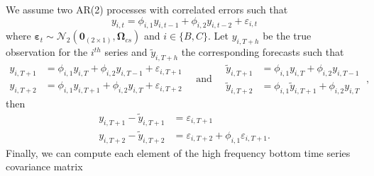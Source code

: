 \documentclass[a4paper,11pt]{article}
\newcommand{\epsvet}{\bm{\varepsilon}}
\newcommand{\Zerovet}{\bm{0}}
\newcommand{\Omegavet}{\bm{\Omega}}
\theoremstyle{definition}
\begin{document}
We assume two AR(2) processes with correlated errors such that
$$
	y_{i,t} = \phi_{i,1}y_{i,t-1} + \phi_{i,2}y_{i,t-2} + \varepsilon_{i,t}
$$
where $\epsvet_t \sim \mathcal{N}_{2}\left(\Zerovet_{(2\times 1)}, \Omegavet_{cs}\right)$ and $i \in \{B, C\}$. Let $y_{i,T+h}$ be the true observation for the $i^{th}$ series and $\widetilde{y}_{i,T+h}$ the corresponding forecasts such that
$$
	\begin{array}{rl}
		y_{i,T+1} & = \phi_{i,1}y_{i,T} + \phi_{i,2}y_{i,T-1} + \varepsilon_{i,T+1} \\
		y_{i,T+2} & = \phi_{i,1}y_{i,T+1} + \phi_{i,2}y_{i,T} + \varepsilon_{i,T+2}
	\end{array}
	\quad\text{and}\quad
	\begin{array}{rl}
		\widetilde{y}_{i,T+1} & = \phi_{i,1}y_{i,T} + \phi_{i,2}y_{i,T-1}             \\
		\widetilde{y}_{i,T+2} & = \phi_{i,1}\widetilde{y}_{i,T+1} + \phi_{i,2}y_{i,T}
	\end{array}\;,
$$
then
\begin{align*}
	y_{i,T+1} - \widetilde{y}_{i,T+1} & = \varepsilon_{i,T+1}                                   \\
	y_{i,T+2} - \widetilde{y}_{i,T+2} & = \varepsilon_{i,T+2} + \phi_{i,1} \varepsilon_{i,T+1}.
\end{align*}
Finally, we can compute each element of the high frequency bottom time series covariance matrix
\end{document}
